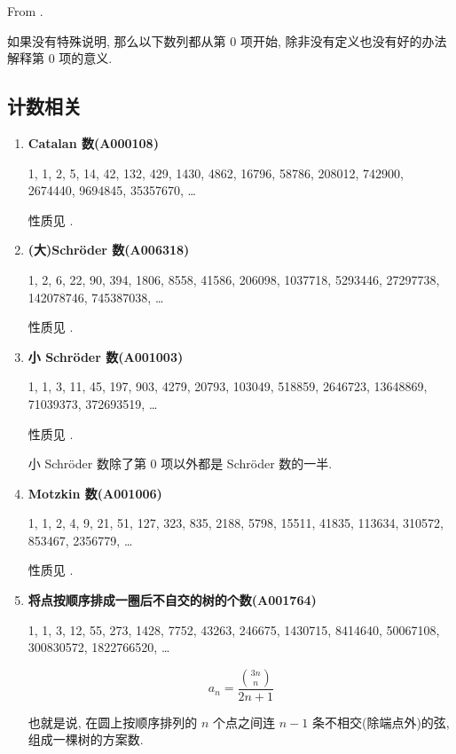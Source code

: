 From \cite{antileafstandard}.

如果没有特殊说明, 那么以下数列都从第 \(0\) 项开始, 除非没有定义也没有好的办法解释第 \(0\) 项的意义.

\subsection{计数相关}

\begin{enumerate}
    \item \textbf{Catalan 数(A000108)}

          1, 1, 2, 5, 14, 42, 132, 429, 1430, 4862, 16796, 58786, 208012, 742900, 2674440, 9694845, 35357670, \dots

          性质见 .

    \item \textbf{(大)Schr\"oder 数(A006318)}

          1, 2, 6, 22, 90, 394, 1806, 8558, 41586, 206098, 1037718, 5293446, 27297738, 142078746, 745387038, \dots

          性质见 .

    \item \textbf{小 Schr\"oder 数(A001003)}

          1, 1, 3, 11, 45, 197, 903, 4279, 20793, 103049, 518859, 2646723, 13648869, 71039373, 372693519, \dots

          性质见 .

          小 Schr\"oder 数除了第 \(0\) 项以外都是 Schr\"oder 数的一半.

    \item \textbf{Motzkin 数(A001006)}

          1, 1, 2, 4, 9, 21, 51, 127, 323, 835, 2188, 5798, 15511, 41835, 113634, 310572, 853467, 2356779, \dots

          性质见 .

    \item \textbf{将点按顺序排成一圈后不自交的树的个数(A001764)}

          1, 1, 3, 12, 55, 273, 1428, 7752, 43263, 246675, 1430715, 8414640, 50067108, 300830572, 1822766520, \dots

          \[
              a_n = \frac {{3n \choose n}} {2n + 1}
          \]

          也就是说, 在圆上按顺序排列的 \(n\) 个点之间连 \(n - 1\) 条不相交(除端点外)的弦, 组成一棵树的方案数.


\end{enumerate}
